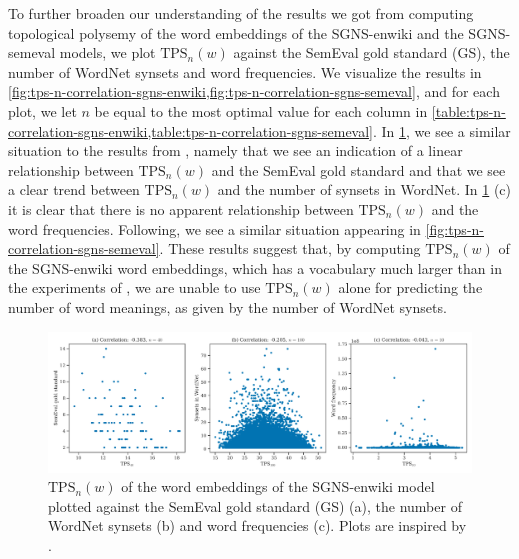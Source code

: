 To further broaden our understanding of the results we got from computing topological polysemy of the word embeddings of the SGNS-enwiki and the SGNS-semeval models, we plot $\text{TPS}_n(w)$ against the SemEval gold standard (GS), the number of WordNet synsets and word frequencies. We visualize the results in \cref{fig:tps-n-correlation-sgns-enwiki,fig:tps-n-correlation-sgns-semeval}, and for each plot, we let $n$ be equal to the most optimal value for each column in \cref{table:tps-n-correlation-sgns-enwiki,table:tps-n-correlation-sgns-semeval}. In \cref{fig:tps-n-correlation-sgns-enwiki}, we see a similar situation to the results from \cite[Figures 8 and 9]{jakubowski2020topology}, namely that we see an indication of a linear relationship between $\text{TPS}_n(w)$ and the SemEval gold standard and that we see a clear trend between $\text{TPS}_n(w)$ and the number of synsets in WordNet. In \cref{fig:tps-n-correlation-sgns-enwiki} (c) it is clear that there is no apparent relationship between $\text{TPS}_n(w)$ and the word frequencies. Following, we see a similar situation appearing in \cref{fig:tps-n-correlation-sgns-semeval}. These results suggest that, by computing $\text{TPS}_n(w)$ of the SGNS-enwiki word embeddings, which has a vocabulary much larger than in the experiments of \cite{jakubowski2020topology}, we are unable to use $\text{TPS}_n(w)$ alone for predicting the number of word meanings, as given by the number of WordNet synsets.
\begin{figure}[H]
    \centering
    \includegraphics[width=\textwidth]{thesis/figures/tps-n-correlation-sgns-enwiki.pdf}
    \caption{$\text{TPS}_n(w)$ of the word embeddings of the SGNS-enwiki model plotted against the SemEval gold standard (GS) (a), the number of WordNet synsets (b) and word frequencies (c). Plots are inspired by \cite[Figures 8 and 9]{jakubowski2020topology}.}
    \label{fig:tps-n-correlation-sgns-enwiki}
\end{figure}
